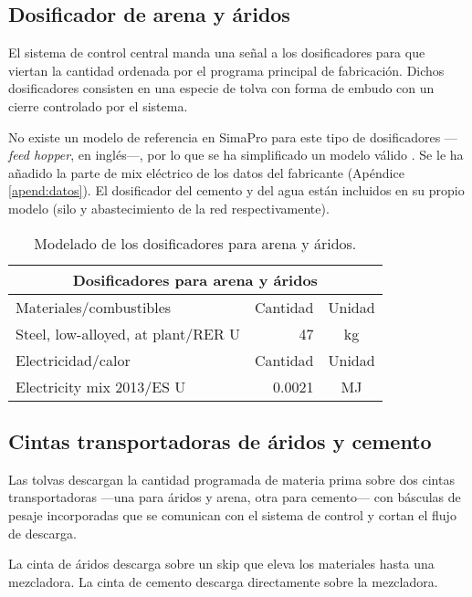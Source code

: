 \subsection{Dosificador de arena y áridos}

El sistema de control central manda una señal a los dosificadores para que viertan la cantidad ordenada por el programa principal de fabricación. Dichos dosificadores consisten en una especie de tolva con forma de embudo con un cierre controlado por el sistema.

No existe un modelo de referencia en SimaPro para este tipo de dosificadores —\textit{feed hopper}, en inglés—, por lo que se ha simplificado un modelo válido \cite{woodpellet}. Se le ha añadido la parte de mix eléctrico de los datos del fabricante (Apéndice \ref{apend:datos}). El dosificador del cemento y del agua están incluidos en su propio modelo (silo y abastecimiento de la red respectivamente).

\begin{table}[!htb]
\centering
\begin{tabular}{p{8cm}rc}
\toprule
\multicolumn{3}{c}{Dosificadores para arena y áridos}\\
\midrule
Materiales/combustibles & Cantidad & Unidad\\
\midrule
Steel, low-alloyed, at plant/RER U & 47 & \si{kg}\\
\midrule
Electricidad/calor & Cantidad & Unidad\\
\midrule
Electricity mix 2013/ES U & 0.0021 & \si{MJ}\\
\bottomrule
\end{tabular}
\caption{Modelado de los dosificadores para arena y áridos.}
\label{modeladodedosificadores}
\end{table}

\subsection{Cintas transportadoras de áridos y cemento}

Las tolvas descargan la cantidad programada de materia prima sobre dos cintas transportadoras —una para áridos y arena, otra para cemento— con básculas de pesaje incorporadas que se comunican con el sistema de control y cortan el flujo de descarga.

La cinta de áridos descarga sobre un skip que eleva los materiales hasta una mezcladora. La cinta de cemento descarga directamente sobre la mezcladora.

